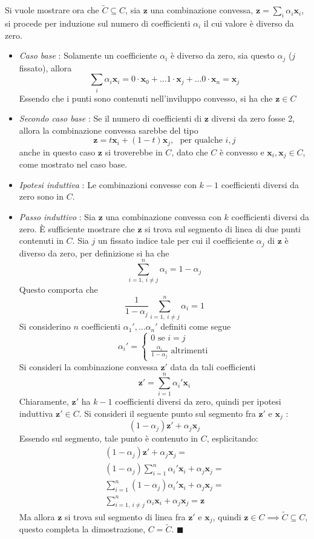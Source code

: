 \documentclass[10pt, letterpaper]{report}
\begin{document}
Si vuole mostrare ora che $\tilde C\subseteq  C$, sia $\mathbf z$ una combinazione convessa, $\mathbf z=\sum_i\alpha_i\mathbf x_i$, si procede per induzione sul numero di coefficienti $\alpha_i$ il cui valore è diverso da zero.\begin{itemize}
    \item \textit{Caso base} : Solamente un coefficiente $\alpha_i$ è diverso da zero, sia questo $\alpha_j$ ($j$ fissato), allora $$ \sum_i\alpha_i\mathbf x_i=0\cdot \mathbf x_0+\dots 1\cdot \mathbf x_j+\dots 0\cdot \mathbf x_n = \mathbf x_j $$
    Essendo che i punti sono contenuti nell'inviluppo convesso, si ha che $\mathbf z\in C$
    \item \textit{Secondo caso base} : Se il numero di coefficienti di $\mathbf z$ diversi da zero fosse 2, allora la combinazione convessa sarebbe del tipo $$ \mathbf z =t\mathbf x_i+(1-t)\mathbf x_j, \ \ \ \text{per qualche }i,j$$
    anche in questo caso $\mathbf z$ si troverebbe in $C$, dato che $C$ è convesso e $\mathbf x_i,\mathbf x_j\in C$, come mostrato nel caso base.
    \item \textit{Ipotesi induttiva} : Le combinazioni convesse con $k-1$ coefficienti diversi da zero sono in $C$.
    \item \textit{Passo induttivo} : Sia $\mathbf z$ una combinazione convessa con $k$ coefficienti diversi da zero. È sufficiente mostrare che $\mathbf z$ si trova sul segmento di linea di due punti contenuti in $C$. Sia $j$ un fissato indice tale per cui il coefficiente $\alpha_j$ di $\mathbf z$ è diverso da zero, per definizione si ha che $$ \sum_{i=1, \ i\ne j}^n \alpha_i=1-\alpha_j$$
     Questo comporta che 
     $$ \frac{1}{1-\alpha_j}\sum_{i=1, \ i\ne j}^n \alpha_i=1$$
     Si considerino $n$ coefficienti $\alpha_1',\dots \alpha_n'$ definiti come segue $$ \alpha_i'=\begin{cases}
        0 \text{ se }i=j\\ 
        \frac{\alpha_i}{1-\alpha_j} \text{ altrimenti}
     \end{cases}$$
     Si consideri la combinazione convessa $\mathbf z'$ data da tali coefficienti 
     $$ \mathbf z'=\sum_{i=1}^n \alpha_i'\mathbf x_i$$
     Chiaramente, $\mathbf z'$ ha $k-1$ coefficienti diversi da zero, quindi per ipotesi induttiva $\mathbf z'\in C$. Si consideri il seguente punto sul segmento fra $\mathbf z'$ e $\mathbf x_j$ : $$
     (1-\alpha_j)\mathbf z'+\alpha_j\mathbf x_j 
     $$
     Essendo sul segmento, tale punto è contenuto in $C$, esplicitando:\begin{eqnarray}
        (1-\alpha_j)\mathbf z'+\alpha_j\mathbf x_j =\\ 
        (1-\alpha_j) \sum_{i=1}^n \alpha_i'\mathbf x_i+\alpha_j\mathbf x_j =\\ 
        \sum_{i=1}^n (1-\alpha_j) \alpha_i'\mathbf x_i+\alpha_j\mathbf x_j =\\ 
        \sum_{i=1, \ i\ne j}^n \alpha_i\mathbf x_i+\alpha_j\mathbf x_j=\mathbf z 
     \end{eqnarray}
     Ma allora $\mathbf z$ si trova sul segmento di linea fra $\mathbf z'$ e $\mathbf x_j$, quindi $\mathbf z\in C \implies \tilde C\subseteq  C$, questo completa la dimostrazione, $C=\tilde C$. \hfill$\blacksquare$
\end{itemize} 
\end{document}
